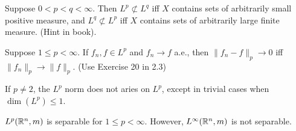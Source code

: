 \documentclass{article}
\begin{document}
 Suppose $0 < p < q < \infty$. Then $L^p \not\subset L^q$ iff $X$ contains sets of arbitrarily small positive measure, and $L^q \not \subset L^p$ iff $X$ contains sets of arbitrarily large finite measure. (Hint in book).

 Suppose $1 \le p < \infty$. If $f_n, f \in L^p$ and $f_n \to f$ a.e., then $\|f_n - f\|_p \to 0$ iff $\|f_n\|_p \to \|f\|_p$. (Use Exercise 20 in 2.3)

 If $p \neq 2$, the $L^p$ norm does not aries on $L^p$, except in trivial cases when $\dim(L^p) \le 1$.

 $L^p(\mathbb{R}^n, m)$ is separable for $1 \le p < \infty$. However, $L^\infty(\mathbb{R}^n, m)$ is not separable.
\end{document}
